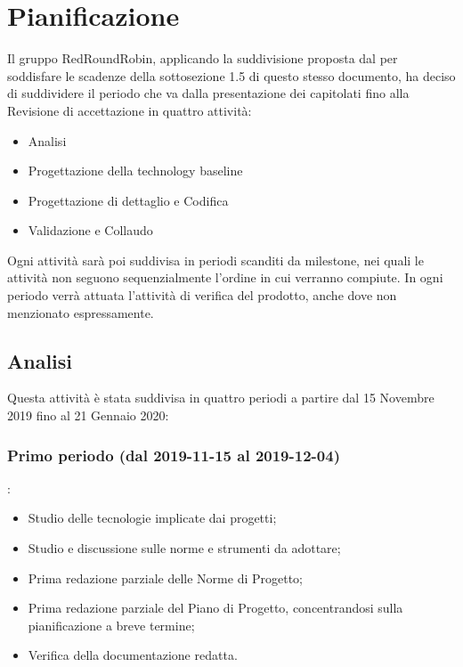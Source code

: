 \section{Pianificazione}
	Il gruppo RedRoundRobin, applicando la suddivisione proposta dal  per soddisfare le scadenze della sottosezione 1.5 di questo stesso documento, ha deciso di suddividere il periodo che va dalla presentazione dei capitolati fino alla Revisione di accettazione in quattro attività:
	\begin{itemize}
		\item Analisi
		\item Progettazione della technology baseline
		\item Progettazione di dettaglio e Codifica
		\item Validazione e Collaudo
	\end{itemize}
	Ogni attività sarà poi suddivisa in periodi scanditi da milestone, nei quali le attività non seguono sequenzialmente l'ordine in cui verranno compiute.
	In ogni periodo verrà attuata l'attività di verifica del prodotto, anche dove non menzionato espressamente. 

	\subsection{Analisi}
	Questa attività è stata suddivisa in quattro periodi a partire dal 15 Novembre 2019 fino al 21 Gennaio 2020:

		\subsubsection{Primo periodo (dal 2019-11-15 al 2019-12-04)}:
		\begin{itemize}
			\item Studio delle tecnologie implicate dai progetti;
			\item Studio e discussione sulle norme e strumenti da adottare;
			\item Prima redazione parziale delle Norme di Progetto;
			\item Prima redazione parziale del Piano di Progetto, concentrandosi sulla pianificazione a breve termine;
			\item Verifica della documentazione redatta.
		\end{itemize}
